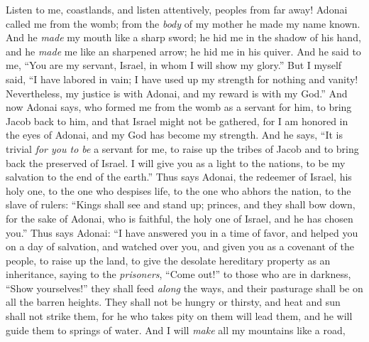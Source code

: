 \begin{biblechapter} %
 Listen to me, coastlands, 
and listen attentively, peoples from far away! 
Adonai called me from the womb; 
from the \textit{body} of my mother he made my name known.
\verse And he \textit{made} my mouth like a sharp sword; 
he hid me in the shadow of his hand, 
and he \textit{made} me like an sharpened arrow; 
he hid me in his quiver.
\verse And he said to me, “You are my servant, 
Israel, in whom I will show my glory.”
\verse But I myself said, “I have labored in vain; 
I have used up my strength for nothing and vanity! 
Nevertheless, my justice is with Adonai, 
and my reward is with my God.”
\verse And now Adonai says, 
who formed me from the womb as a servant for him, 
to bring Jacob back to him, 
and that Israel might not be gathered, 
for I am honored in the eyes of Adonai, 
and my God has become my strength.
\verse And he says, “It is trivial \textit{for you to be} a servant for me, to raise up the tribes of Jacob 
and to bring back the preserved of Israel. 
I will give you as a light to the nations, 
to be my salvation to the end of the earth.”
\verse Thus says Adonai, the redeemer of Israel, his holy one, to the one who despises life, 
to the one who abhors the nation, 
to the slave of rulers: 
“Kings shall see and stand up; 
princes, and they shall bow down, 
for the sake of Adonai, who is faithful, 
the holy one of Israel, and he has chosen you.”
 Thus says Adonai:
\verse “I have answered you in a time of favor, 
and helped you on a day of salvation, 
and watched over you, 
and given you as a covenant of the people, 
to raise up the land, 
to give the desolate hereditary property as an inheritance,
\verse saying to the \textit{prisoners}, “Come out!” 
to those who are in darkness, “Show yourselves!” 
they shall feed \textit{along} the ways, 
and their pasturage shall be on all the barren heights.
\verse They shall not be hungry or thirsty, 
and heat and sun shall not strike them, 
for he who takes pity on them will lead them, 
and he will guide them to springs of water.
\verse And I will \textit{make} all my mountains like a road, 

\end{biblechapter}

